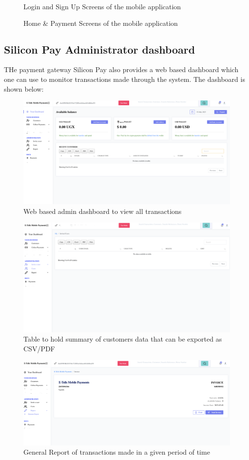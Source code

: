 \begin{figure}[h]
    \caption{Login and Sign Up Screens of the mobile application}%
    \label{fig:example}%
\end{figure}
\begin{figure}[h]%
    \centering
    \caption{Home & Payment Screens of the mobile application}%
    \label{fig:example1}%
\end{figure}

\clearpage
\subsection{Silicon Pay Administrator dashboard}
THe payment gateway Silicon Pay also provides a web based dashboard which one can use to monitor transactions made through the system. The dashboard is shown below:
\begin{figure}[h]
    \begin{center}
        \includegraphics[scale = 0.1]{images/dashboard_1}
        \caption{Web based admin dashboard to view all transactions}
    \end{center}
\end{figure}


\begin{figure}[h]
    \begin{center}
        \includegraphics[scale = 0.1]{images/dashboard_2}
        \caption{Table to hold summary of customers data that can be exported as CSV/PDF}
    \end{center}
\end{figure}

\begin{figure}[h]
    \begin{center}
        \includegraphics[scale = 0.1]{images/dashboard_3}
        \caption{ General Report of transactions made in a given period of time}
    \end{center}
\end{figure}

